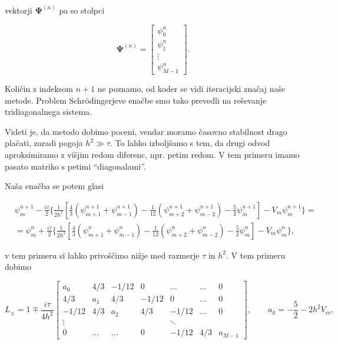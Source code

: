 \documentclass[a4 paper, 12pt]{article}
\begin{document}
vektorji $\mathbf{\Psi}^{(n)}$ pa so stolpci

\begin{equation}
	\mathbf{\Psi}^{(n)} = \begin{bmatrix} \psi_0^n \\ \psi_1^n \\ \vdots \\ \psi_{M-1}^n
		\end{bmatrix}.
\end{equation}

Količin z indeksom $n+1$ ne poznamo, od koder se vidi iteracijski značaj naše metode. Problem
Schr\" odingerjeve enačbe smo tako prevedli na reševanje tridiagonalnega sistema.

Videti je, da metodo dobimo poceni, vendar moramo časovno stabilnost drago plačati, zaradi
pogoja $h^2 \gg \tau$. To lahko izboljšamo s tem, da drugi odvod aproksimiramo z višjim redom
diferenc, npr. petim redom. V tem primeru imamo pasato matriko s petimi "`diagonalami"'.

Naša enačba se potem glasi

\begin{align*}
	&\psi_m^{n+1} - \frac{i\tau}{2}\bigg\{\frac{1}{2h^2}\left[\frac{4}{3}\left(
		\psi_{m+1}^{n+1} + \psi_{m-1}^{n+1}\right) - \frac{1}{12}\left(
		\psi_{m+2}^{n+1} + \psi_{m-2}^{n+1}\right) - \frac{5}{2}\psi_m^{n+1}\right] 
		- V_m\psi_m^{n+1}\bigg\} = \\
	&= \psi_m^n + \frac{i\tau}{2}\bigg\{\frac{1}{2h^2}\left[\frac{4}{3}\left(
		\psi_{m+1}^n + \psi_{m-1}^n\right) - \frac{1}{12}\left(
		\psi_{m+2}^n + \psi_{m-2}^n\right) - \frac{5}{2}\psi_m^n\right] -
		V_m\psi_m^n\bigg\},
\end{align*}

v tem primeru si lahko privoščimo nižje med razmerje $\tau$ in $h^2$. V tem primeru
dobimo

\begin{equation}
	L_\pm = 1 \mp \frac{i\tau}{4h^2}\begin{bmatrix}
		a_0 & 4/3 & -1/12 & 0 & \ldots & \ldots & 0 \\
		4/3 & a_1 & 4/3 & -1/12 & 0 & \ldots & 0 \\
		-1/12 & 4/3 & a_2 & 4/3 & -1/12 & \ldots & 0 \\
		\vdots & & & & \ddots & \\
		0 & \ldots & \ldots & 0 & -1/12 & 4/3 & a_{M-1} \end{bmatrix}, \qquad
	a_k = -\frac{5}{2} - 2h^2V_m,
	\label{metoda}
\end{equation}
\end{document}
